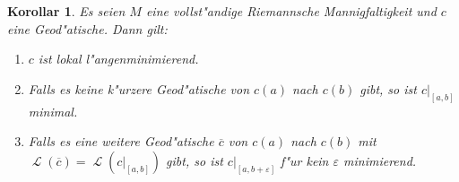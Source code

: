 \documentclass[paper=A4, twoside, chapterprefix=true, bibliography=totoc, headsepline]{scrbook}
\let\temp\phi{}
\let\phi\varphi{}
\let\varphi\temp{}
\let\temp\theta{}
\let\theta\vartheta{}
\let\vartheta\temp{}
\let\temp\epsilon{}
\let\epsilon\varepsilon{}
\let\varepsilon\temp{}
\let\temp\rho{}
\let\rho\varrho{}
\let\varrho\temp{}
\DeclareMathOperator{\calL}{\mathcal{L}}
\theoremstyle{plain}
\newtheorem{Kor}[Dfn]{Korollar}
\theoremstyle{nonumberplain}
\theoremstyle{empty}
\theoremstyle{break}
\begin{document}
\begin{Kor}\label{thm:kor-8-12}
  Es seien $M$ eine vollst"andige Riemannsche Mannigfaltigkeit und $c$ eine Geod"atische. Dann gilt:
  \begin{enumerate}[label=(\roman*),widest=iii,leftmargin=*]
  \item $c$ ist lokal l"angenminimierend.
  \item Falls es keine k"urzere Geod"atische von $c(a)$ nach $c(b)$ gibt, so ist $c|_{[a,b]}$ minimal.
  \item Falls es eine weitere Geod"atische $\overline{c}$ von $c(a)$ nach $c(b)$ mit $\calL(\overline c) = \calL(c|_{[a,b]})$ gibt, so ist $c|_{[a,b+\epsilon]}$ f"ur kein $\epsilon$ minimierend.\label{thm:kor-8-12-iii} 
  \end{enumerate}
\end{Kor}
\end{document}
